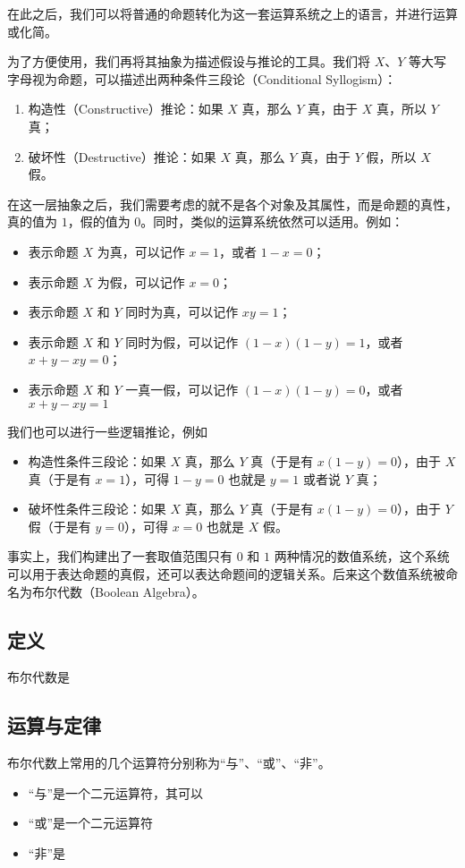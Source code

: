         在此之后，我们可以将普通的命题转化为这一套运算系统之上的语言，并进行运算或化简。

        为了方便使用，我们再将其抽象为描述假设与推论的工具。我们将 $X$、$Y$ 等大写字母视为命题，可以描述出两种条件三段论（Conditional Syllogism）：
        \begin{enumerate}
            \item 构造性（Constructive）推论：如果 $X$ 真，那么 $Y$ 真，由于 $X$ 真，所以 $Y$ 真；
            \item 破坏性（Destructive）推论：如果 $X$ 真，那么 $Y$ 真，由于 $Y$ 假，所以 $X$ 假。
        \end{enumerate}

        在这一层抽象之后，我们需要考虑的就不是各个对象及其属性，而是命题的真性，真的值为 $1$，假的值为 $0$。同时，类似的运算系统依然可以适用。例如：
        \begin{itemize}
            \item 表示命题 $X$ 为真，可以记作 $x = 1$，或者 $1 - x = 0$；
            \item 表示命题 $X$ 为假，可以记作 $x = 0$；
            \item 表示命题 $X$ 和 $Y$ 同时为真，可以记作 $xy = 1$；
            \item 表示命题 $X$ 和 $Y$ 同时为假，可以记作 $(1 - x)(1 - y) = 1$，或者 $x + y - xy = 0$；
            \item 表示命题 $X$ 和 $Y$ 一真一假，可以记作 $(1 - x)(1 - y) = 0$，或者 $x + y - xy = 1$
        \end{itemize}

        我们也可以进行一些逻辑推论，例如
        \begin{itemize}
            \item 构造性条件三段论：如果 $X$ 真，那么 $Y$ 真（于是有 $x(1 - y) = 0$），由于 $X$ 真（于是有 $x = 1$），可得 $1 - y = 0$ 也就是 $y = 1$ 或者说 $Y$ 真；
            \item 破坏性条件三段论：如果 $X$ 真，那么 $Y$ 真（于是有 $x(1 - y) = 0$），由于 $Y$ 假（于是有 $y = 0$），可得 $x = 0$ 也就是 $X$ 假。
        \end{itemize}

        事实上，我们构建出了一套取值范围只有 $0$ 和 $1$ 两种情况的数值系统，这个系统可以用于表达命题的真假，还可以表达命题间的逻辑关系。后来这个数值系统被命名为布尔代数（Boolean Algebra）。

    \subsection{定义}\label{subsec:Calculations/BooleanAlgebra/Definition}
        布尔代数是

    \subsection{运算与定律}\label{subsec:subsec:Calculations/BooleanAlgebra/OperationsAndLaws}
        布尔代数上常用的几个运算符分别称为“与”、“或”、“非”。

        \begin{itemize}
            \item “与”是一个二元运算符，其可以
            \item “或”是一个二元运算符
            \item “非”是
        \end{itemize}
